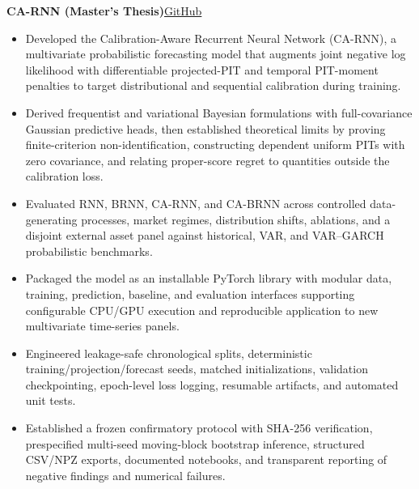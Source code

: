 \documentclass[11pt]{article}
\newcommand{\projectentry}[2]{%
  \Needspace{8\baselineskip}%
  \textbf{#1}\hfill #2\\[-8pt]%
}
\newenvironment{tightitemize}{%
  \vspace{-2pt}%
  \begin{itemize}[leftmargin=*,topsep=0pt,itemsep=1pt,parsep=0pt,partopsep=0pt]
}{%
  \end{itemize}\vspace{4pt}
}
\begin{document}
\projectentry
{CA-RNN (Master's Thesis)}
{\href{https://github.com/JonathanMa03/innovative-droBVAR}{GitHub}}
\begin{tightitemize}
\item Developed the Calibration-Aware Recurrent Neural Network (CA-RNN), a multivariate probabilistic forecasting model that augments joint negative log likelihood with differentiable projected-PIT and temporal PIT-moment penalties to target distributional and sequential calibration during training.
\item Derived frequentist and variational Bayesian formulations with full-covariance Gaussian predictive heads, then established theoretical limits by proving finite-criterion non-identification, constructing dependent uniform PITs with zero covariance, and relating proper-score regret to quantities outside the calibration loss.
\item Evaluated RNN, BRNN, CA-RNN, and CA-BRNN across controlled data-generating processes, market regimes, distribution shifts, ablations, and a disjoint external asset panel against historical, VAR, and VAR--GARCH probabilistic benchmarks.
\item Packaged the model as an installable PyTorch library with modular data, training, prediction, baseline, and evaluation interfaces supporting configurable CPU/GPU execution and reproducible application to new multivariate time-series panels.
\item Engineered leakage-safe chronological splits, deterministic training/projection/forecast seeds, matched initializations, validation checkpointing, epoch-level loss logging, resumable artifacts, and automated unit tests.
\item Established a frozen confirmatory protocol with SHA-256 verification, prespecified multi-seed moving-block bootstrap inference, structured CSV/NPZ exports, documented notebooks, and transparent reporting of negative findings and numerical failures.
\end{tightitemize}
\end{document}
